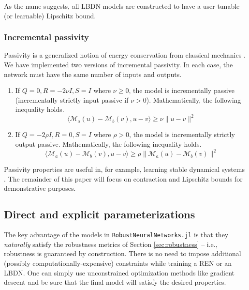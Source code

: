 As the name suggests, all LBDN models are constructed to have a user-tunable (or learnable) Lipschitz bound.

\subsubsection{Incremental passivity} 
Passivity is a generalized notion of energy conservation from classical mechanics \cite{vanderSchaft2017}.
We have implemented two versions of incremental passivity. In each case, the network must have the same number of inputs and outputs.

\begin{enumerate}
    \item If $Q = 0, R = -2\nu I, S = I$ where $\nu \ge 0$, the model is incrementally passive (incrementally strictly input passive if $\nu > 0$). Mathematically, the following inequality holds.
    \begin{equation}
    \langle \mathcal{M}_a(u) - \mathcal{M}_b(v), u-v \rangle \ge \nu \| u-v\|^2
    \end{equation}
    \item If $Q = -2\rho I, R = 0, S = I$ where $\rho > 0$, the model is incrementally strictly output passive. Mathematically, the following inequality holds.
    \begin{equation}
    \langle \mathcal{M}_a(u) - \mathcal{M}_b(v), u-v \rangle \ge \rho \| \mathcal{M}_a(u) - \mathcal{M}_b(v)\|^2
    \end{equation}
\end{enumerate}

Passivity properties are useful in, for example, learning stable dynamical systems \cite{Cheng++2024}. The remainder of this paper will focus on contraction and Lipschitz bounds for demonstrative purposes.

\subsection{Direct and explicit parameterizations} \label{sec:parameterizations}

The key advantage of the models in \verb|RobustNeuralNetworks.jl| is that they \textit{naturally} satisfy the robustness metrics of Section \ref{sec:robustness} -- i.e., robustness is guaranteed by construction. There is no need to impose additional (possibly computationally-expensive) constraints while training a REN or an LBDN. One can simply use unconstrained optimization methods like gradient descent and be sure that the final model will satisfy the desired properties.

